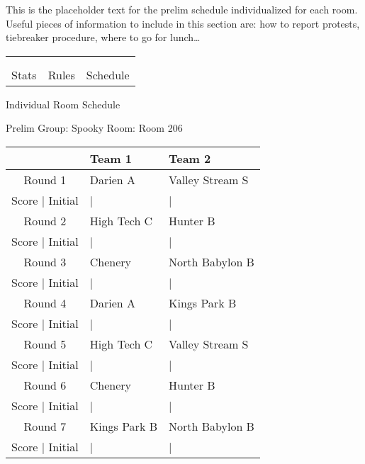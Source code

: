 \documentclass{article}%
\begin{document}
This is the placeholder text for the prelim schedule individualized for each room. Useful pieces of information to include in this section are: how to report protests, tiebreaker procedure, where to go for lunch…%
\vspace*{30pt}%
\newline%
%
\begin{tabularx}{\textwidth}{YYY}%
  &  &  \\%
\\%
Stats&Rules&Schedule\\%
\end{tabularx}%
\newpage%
\begin{center}%
\begin{Huge}%
Individual Room Schedule%
\end{Huge}%
\vspace*{16pt}%
\linebreak%
\begin{Large}%
Prelim Group: Spooky \hfill Room: Room 206%
\end{Large}%
\end{center}%
%
\begin{tabularx}{\textwidth}{|c|Y|Y|}%
\hline%
&Team 1&Team 2\\%
\hline%
Round 1&Darien A&Valley Stream S\\%
\hline%
Score | Initial&|&|\\%
\hline%
Round 2&High Tech C&Hunter B\\%
\hline%
Score | Initial&|&|\\%
\hline%
Round 3&Chenery&North Babylon B\\%
\hline%
Score | Initial&|&|\\%
\hline%
Round 4&Darien A&Kings Park B\\%
\hline%
Score | Initial&|&|\\%
\hline%
Round 5&High Tech C&Valley Stream S\\%
\hline%
Score | Initial&|&|\\%
\hline%
Round 6&Chenery&Hunter B\\%
\hline%
Score | Initial&|&|\\%
\hline%
Round 7&Kings Park B&North Babylon B\\%
\hline%
Score | Initial&|&|\\%
\hline%
\end{tabularx}%
\end{document}
